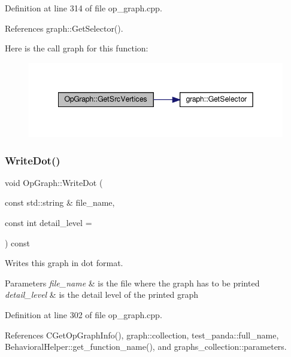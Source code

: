 Definition at line 314 of file op\+\_\+graph.\+cpp.



References graph\+::\+Get\+Selector().

Here is the call graph for this function\+:
\nopagebreak
\begin{figure}[H]
\begin{center}
\leavevmode
\includegraphics[width=342pt]{d6/d79/structOpGraph_aef07453090deb05f3b216ac159043b07_cgraph}
\end{center}
\end{figure}
\mbox{\label{structOpGraph_a701ba67fb9b76ca7cf399f2af98cf815}} 
\subsubsection{\texorpdfstring{Write\+Dot()}{WriteDot()}}
{\footnotesize\ttfamily void Op\+Graph\+::\+Write\+Dot (\begin{DoxyParamCaption}\item[{const std\+::string \&}]{file\+\_\+name,  }\item[{const int}]{detail\+\_\+level = {} }\end{DoxyParamCaption}) const}



Writes this graph in dot format. 


\begin{DoxyParams}{Parameters}
{\em file\+\_\+name} & is the file where the graph has to be printed \\
\hline
{\em detail\+\_\+level} & is the detail level of the printed graph \\
\hline
\end{DoxyParams}


Definition at line 302 of file op\+\_\+graph.\+cpp.



References C\+Get\+Op\+Graph\+Info(), graph\+::collection, test\+\_\+panda\+::full\+\_\+name, Behavioral\+Helper\+::get\+\_\+function\+\_\+name(), and graphs\+\_\+collection\+::parameters.



